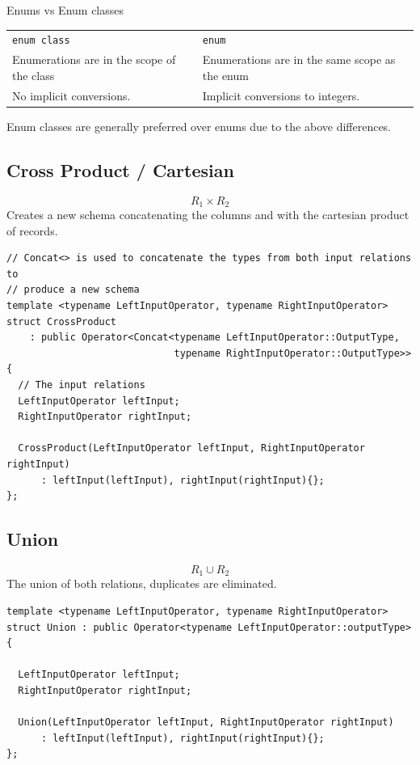 \begin{sidenotebox}{Enums vs Enum classes}
  \begin{center}
    \begin{tabular}{p{} p{}}
      \centerline{\texttt{enum class}} & \centerline{\texttt{enum}} \\
      Enumerations are in the scope of the class & Enumerations are in the same scope as the enum \\
      No implicit conversions. & Implicit conversions to integers. \\ 
    \end{tabular}
  \end{center}
  Enum classes are generally preferred over enums due to the above differences. 
\end{sidenotebox}

\subsection{Cross Product / Cartesian}
\[R_1 \times R_2\]
Creates a new schema concatenating the columns and with the cartesian product of records.

\begin{verbatim}
// Concat<> is used to concatenate the types from both input relations to 
// produce a new schema
template <typename LeftInputOperator, typename RightInputOperator>
struct CrossProduct
    : public Operator<Concat<typename LeftInputOperator::OutputType,
                             typename RightInputOperator::OutputType>> {
  // The input relations
  LeftInputOperator leftInput;
  RightInputOperator rightInput;

  CrossProduct(LeftInputOperator leftInput, RightInputOperator rightInput)
      : leftInput(leftInput), rightInput(rightInput){};
};
\end{verbatim}

\subsection{Union}
\[R_1 \cup R_2\]
The union of both relations, duplicates are eliminated.
\begin{verbatim}
template <typename LeftInputOperator, typename RightInputOperator>
struct Union : public Operator<typename LeftInputOperator::outputType> {
  
  LeftInputOperator leftInput;
  RightInputOperator rightInput;

  Union(LeftInputOperator leftInput, RightInputOperator rightInput)
      : leftInput(leftInput), rightInput(rightInput){};
};
\end{verbatim}

